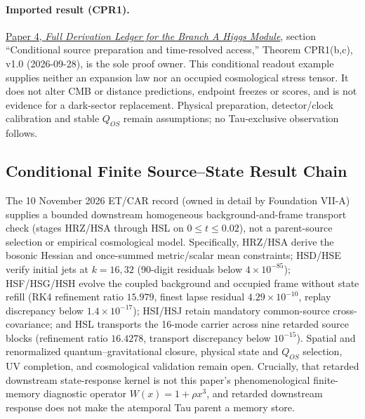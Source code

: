 \documentclass[11pt]{article}
\begin{document}
\paragraph{Imported result (CPR1).}
\href{https://github.com/tau-core-research/tau-core-higgs-module-paper4/blob/main/paper4_full_derivation/full_derivation.pdf#nameddest=cpr1}{Paper 4, \emph{Full Derivation Ledger for the Branch A Higgs Module}}, section ``Conditional source preparation and time-resolved access,'' Theorem CPR1(b,c), v1.0 (2026-09-28), is the sole proof owner.
This conditional readout example supplies neither an expansion law nor an occupied cosmological stress tensor. It does not alter CMB or distance predictions, endpoint freezes or scores, and is not evidence for a dark-sector replacement.
Physical preparation, detector/clock calibration and stable $Q_{OS}$ remain assumptions; no Tau-exclusive observation follows.

\subsection{Conditional Finite Source--State Result Chain}
\label{sec:etcar-chain-20261110}
The 10 November 2026 ET/CAR record (owned in detail by Foundation VII-A)
supplies a bounded downstream homogeneous background-and-frame transport check
(stages HRZ/HSA through HSL on $0\leq t\leq 0.02$), not a parent-source
selection or empirical cosmological model. Specifically, HRZ/HSA derive the
bosonic Hessian and once-summed metric/scalar mean constraints; HSD/HSE verify
initial jets at $k=16,32$ (90-digit residuals below $4\times 10^{-85}$);
HSF/HSG/HSH evolve the coupled background and occupied frame without state
refill (RK4 refinement ratio $15.979$, finest lapse residual
$4.29\times 10^{-10}$, replay discrepancy below $1.4\times 10^{-17}$); HSI/HSJ
retain mandatory common-source cross-covariance; and HSL transports the
16-mode carrier across nine retarded source blocks (refinement ratio $16.4278$,
transport discrepancy below $10^{-15}$). Spatial and renormalized
quantum--gravitational closure, physical state and $Q_{OS}$ selection, UV
completion, and cosmological validation remain open. Crucially, that retarded
downstream state-response kernel is not this paper's phenomenological
finite-memory diagnostic operator $W(x)=1+\rho x^3$, and retarded downstream
response does not make the atemporal Tau parent a memory store.
\end{document}
